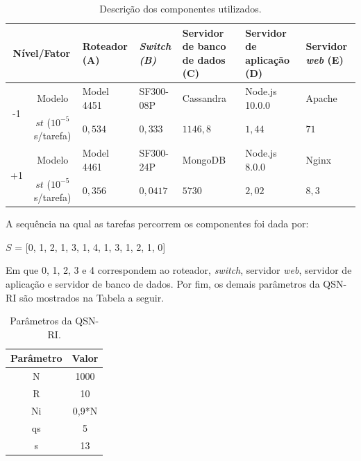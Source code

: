 \begin{table}[!htb]
    \centering
    \caption{\label{tbl:componentes} Descrição dos componentes utilizados.}
        \begin{tabular}{ccm{2.2cm}m{1.9cm}m{2.9cm}m{2.5cm}m{1.6cm}}
            \hline
            \multicolumn{2}{c}{Nível/Fator} & Roteador (A) & \textit{Switch (B)} & Servidor de banco de dados (C) & Servidor de aplicação (D) & Servidor \textit{web} (E) \\ \hline
            \multirow{2}{*}{-1} & Modelo & Model 4451 & SF300-08P & Cassandra & Node.js 10.0.0 & Apache \\
            & $st$ ($10^{-5}$ s/tarefa) & $0,534$ & $0,333$ & $1146,8$ & $1,44$ & $71$ \\ \hline 
            \multirow{2}{*}{+1} & Modelo & Model 4461 & SF300-24P & MongoDB & Node.js 8.0.0 & Nginx \\
            & $st$ ($10^{-5}$ s/tarefa) & $0,356$ & $0,0417$ & $5730$ & $2,02$ & $8,3$ \\ \hline 
        \end{tabular}
    \end{table}

A sequência na qual as tarefas percorrem os componentes foi dada por:

\begin{center}
$S$ = [0, 1, 2, 1, 3, 1, 4, 1, 3, 1, 2, 1, 0]
\end{center}

Em que 0, 1, 2, 3 e 4 correspondem ao roteador, \textit{switch}, servidor \textit{web}, servidor de aplicação e servidor de banco de dados. Por fim, os demais parâmetros da QSN-RI são mostrados na Tabela a seguir.

\begin{table}[!htb]
    \centering
    \caption{Parâmetros da QSN-RI.}
        \begin{tabular}{cc}
            \hline
            Parâmetro & Valor \\ \hline
            N & 1000 \\
            R & 10 \\
            Ni & 0,9*N \\
            qs & 5 \\
            s & 13 \\ \hline
        \end{tabular}
    \end{table}

